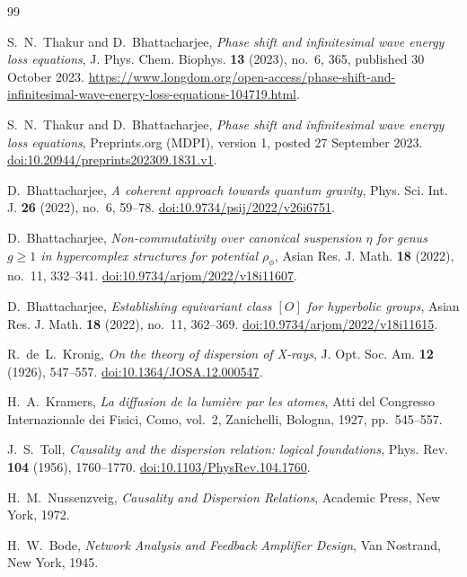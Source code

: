 \begin{thebibliography}{99}\raggedright

S.~N.~Thakur and D.~Bhattacharjee,
\emph{Phase shift and infinitesimal wave energy loss equations},
J. Phys. Chem. Biophys. \textbf{13} (2023), no.~6, 365, published 30 October 2023.
\url{https://www.longdom.org/open-access/phase-shift-and-infinitesimal-wave-energy-loss-equations-104719.html}.

S.~N.~Thakur and D.~Bhattacharjee,
\emph{Phase shift and infinitesimal wave energy loss equations},
Preprints.org (MDPI), version 1, posted 27 September 2023.
\href{https://doi.org/10.20944/preprints202309.1831.v1}{doi:10.20944/preprints202309.1831.v1}.

D.~Bhattacharjee,
\emph{A coherent approach towards quantum gravity},
Phys. Sci. Int. J. \textbf{26} (2022), no.~6, 59--78.
\href{https://doi.org/10.9734/psij/2022/v26i6751}{doi:10.9734/psij/2022/v26i6751}.

D.~Bhattacharjee,
\emph{Non-commutativity over canonical suspension $\eta$ for genus $g\ge1$ in hypercomplex structures for potential $\rho_\phi$},
Asian Res. J. Math. \textbf{18} (2022), no.~11, 332--341.
\href{https://doi.org/10.9734/arjom/2022/v18i11607}{doi:10.9734/arjom/2022/v18i11607}.

D.~Bhattacharjee,
\emph{Establishing equivariant class $[O]$ for hyperbolic groups},
Asian Res. J. Math. \textbf{18} (2022), no.~11, 362--369.
\href{https://doi.org/10.9734/arjom/2022/v18i11615}{doi:10.9734/arjom/2022/v18i11615}.

R.~de~L.~Kronig,
\emph{On the theory of dispersion of X-rays},
J. Opt. Soc. Am. \textbf{12} (1926), 547--557.
\href{https://doi.org/10.1364/JOSA.12.000547}{doi:10.1364/JOSA.12.000547}.

H.~A.~Kramers,
\emph{La diffusion de la lumi\`ere par les atomes},
Atti del Congresso Internazionale dei Fisici, Como, vol.~2,
Zanichelli, Bologna, 1927, pp.~545--557.

J.~S.~Toll,
\emph{Causality and the dispersion relation: logical foundations},
Phys. Rev. \textbf{104} (1956), 1760--1770.
\href{https://doi.org/10.1103/PhysRev.104.1760}{doi:10.1103/PhysRev.104.1760}.

H.~M.~Nussenzveig,
\emph{Causality and Dispersion Relations},
Academic Press, New York, 1972.

H.~W.~Bode,
\emph{Network Analysis and Feedback Amplifier Design},
Van Nostrand, New York, 1945.


\end{thebibliography}
